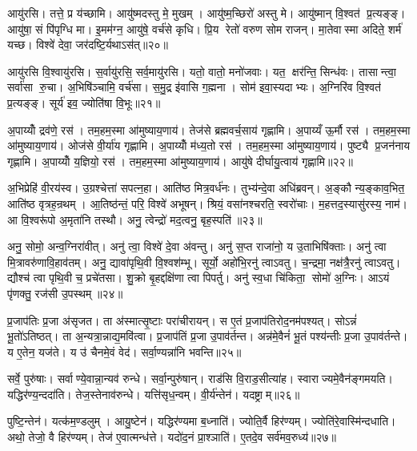 आयु॑रसि। तत्ते॒ प्र य॑च्छामि। आयु॑ष्मदस्तु मे॒ मुखम्। आयु॑ष्म॒च्छिरो॑ अस्तु मे। आयु॑ष्मान् वि॒श्वत॑ प्र॒त्यङ्ङ्। आयु॑षा॒ सं पि॑पृग्धि मा। इ॒मम॑ग्न॒ आयु॑षे॒ वर्च॑से कृधि। प्रि॒य रेतो॑ वरुण सोम राजन्। मा॒तेवास्मा अदिते॒ शर्म॑ यच्छ। विश्वे॑ देवा॒ जर॑दष्टि॒र्यथाऽस॑त्॥२०॥

आयु॑रसि वि॒श्वायु॑रसि। स॒र्वायु॑रसि॒ सर्व॒मायु॑रसि। यतो॒ वातो॒ मनो॑जवाः। यत॒ क्षर॑न्ति॒ सिन्ध॑वः। तासान्त्वा॒ सर्वा॑सा रु॒चा। अ॒भिषि॑ञ्चामि॒ वर्च॑सा। स॒मु॒द्र इ॑वासि ग॒ह्मना। सोम॑ इवा॒स्यदाभ्यः। अ॒ग्निरि॑व वि॒श्वत॑ प्र॒त्यङ्ङ्। सूर्य॑ इव॒ ज्योति॑षा वि॒भूः॥२१॥

अ॒पाय्योँ द्रव॑णे॒ रस॑। तम॒हम॒स्मा आ॑मुष्याय॒णाय॑। तेज॑से ब्रह्मवर्च॒साय॑ गृह्णामि। अ॒पाय्यँ ऊ॒र्मौ रस॑। तम॒हम॒स्मा आ॑मुष्याय॒णाय॑। ओज॑से वी॒र्या॑य गृह्णामि। अ॒पाय्योँ म॑ध्य॒तो रस॑। तम॒हम॒स्मा आ॑मुष्याय॒णाय॑। पुष्ट्यै प्र॒जन॑नाय गृह्णामि। अ॒पाय्योँ य॒ज्ञियो॒ रस॑। तम॒हम॒स्मा आ॑मुष्याय॒णाय॑। आयु॑षे दीर्घायु॒त्वाय॑ गृह्णामि॥२२॥\anuvakamend[गोष्वोज॑स्वन्त श्रीणा॒म्योजो॑ऽसि॒ तत्ते॒ प्रय॑च्छामि॒ पय॑सा॒ संपि॑पृग्धि॒ माऽस॑द्वि॒भूर्य॒ज्ञियो॒ रसो॒ द्वे च॑]

अ॒भिप्रेहि॑ वी॒रय॑स्व। उ॒ग्रश्चेत्ता॑ सपत्न॒हा। आति॑ष्ठ मित्र॒वर्ध॑नः। तुभ्य॑न्दे॒वा अधि॑ब्रवन्। अ॒ङ्कौ न्य॒ङ्काव॒भित॒ आति॑ष्ठ वृत्रह॒न्रथम्। आ॒तिष्ठ॑न्तं॒ परि॒ विश्वे॑ अभूषन्। श्रियं॒ वसा॑नश्चरति॒ स्वरो॑चाः। म॒हत्तद॒स्यासु॑रस्य॒ नाम॑। आ वि॒श्वरू॑पो अ॒मृता॑नि तस्थौ। अनु॒ त्वेन्द्रो॑ मद॒त्वनु॒ बृह॒स्पति॑॥२३॥

अनु॒ सोमो॒ अन्व॒ग्निरा॑वीत्। अनु॑ त्वा॒ विश्वे॑ दे॒वा अ॑वन्तु। अनु॑ स॒प्त राजा॑नो॒ य उ॒ताभिषि॑क्ताः। अनु॑ त्वा मि॒त्रावरु॑णावि॒हाव॑तम्। अनु॒ द्यावा॑पृथि॒वी वि॒श्वश॑म्भू। सूर्यो॒ अहो॑भि॒रनु॑ त्वाऽवतु। च॒न्द्रमा॒ नक्ष॑त्रै॒रनु॑ त्वाऽवतु। द्यौश्च॑ त्वा पृथि॒वी च॒ प्रचे॑तसा। शु॒क्रो बृ॒हद्दक्षि॑णा त्वा पिपर्तु। अनु॑ स्व॒धा चि॑किता॒ सोमो॑ अ॒ग्निः। आऽयं पृ॑णक्तु॒ रज॑सी उ॒पस्थम्॥२४॥\anuvakamend[बृह॒स्पति॒ सोमो॑ अ॒ग्निरेकं च]

प्र॒जाप॑तिः प्र॒जा अ॑सृजत। ता अ॑स्मात्सृ॒ष्टाः परा॑चीरायन्। स ए॒तं प्र॒जाप॑तिरोद॒नम॑पश्यत्। सोऽन्नं॑ भू॒तो॑ऽतिष्ठत्। ता अ॒न्यत्रा॒न्नाद्य॒मवि॑त्वा। प्र॒जाप॑तिं प्र॒जा उ॒पाव॑र्तन्त। अन्न॑मे॒वैनं॑ भू॒तं पश्य॑न्तीः प्र॒जा उ॒पाव॑र्तन्ते। य ए॒तेन॒ यज॑ते। य उ॑ चैनमे॒वं वेद॑। सर्वा॒ण्यन्ना॑नि भवन्ति॥२५॥

सर्वे॒ पुरु॑षाः। सर्वाण्ये॒वान्ना॒न्यव॑ रुन्धे। सर्वा॒न्पुरु॑षान्। राड॑सि वि॒राड॒सीत्या॑ह। स्वाराज्यमे॒वैन॑ङ्गमयति। यद्धिर॑ण्य॒न्ददा॑ति। तेज॒स्तेनाव॑रुन्धे। यत्ति॑सृध॒न्वम्। वी॒र्य॑न्तेन॑। यदष्ट्राम्॥२६॥

पुष्टि॒न्तेन॑। यत्क॑म॒ण्डलुम्। आयु॒ष्टेन॑। यद्धिर॑ण्यमा ब॒ध्नाति॑। ज्योति॒र्वै हिर॑ण्यम्। ज्योति॑रे॒वास्मि॑न्दधाति। अथो॒ तेजो॒ वै हिर॑ण्यम्। तेज॑ ए॒वात्मन्ध॑त्ते। यदो॑द॒नं प्रा॒श्ञाति॑। ए॒तदे॒व सर्व॑मव॒रुध्य॑॥२७॥

